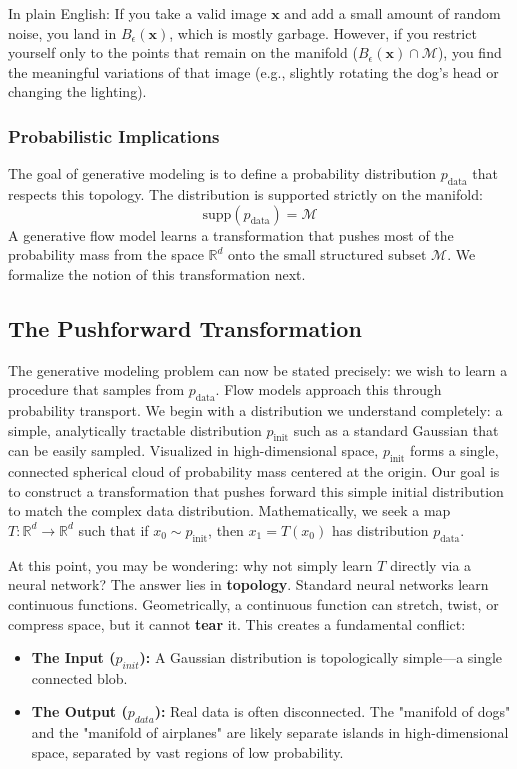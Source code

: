 \documentclass{book}
\begin{document}
In plain English: If you take a valid image $\mathbf{x}$ and add a small amount of random noise, you land in $B_\epsilon(\mathbf{x})$, which is mostly garbage. However, if you restrict yourself only to the points that remain on the manifold ($B_\epsilon(\mathbf{x}) \cap \mathcal{M}$), you find the meaningful variations of that image (e.g., slightly rotating the dog's head or changing the lighting).

\subsubsection{Probabilistic Implications}
The goal of generative modeling is to define a probability distribution $p_{\text{data}}$ that respects this topology. The distribution is supported strictly on the manifold:
\[
\text{supp}(p_{\text{data}}) = \mathcal{M}
\]
A generative flow model learns a transformation that pushes most of the probability mass from the space $\mathbb{R}^d$ onto the small structured subset $\mathcal{M}$. We formalize the notion of this transformation next.

\subsection{The Pushforward Transformation}
The generative modeling problem can now be stated precisely: we wish to learn a procedure that samples from $p_{\text{data}}$. Flow models approach this through probability transport. We begin with a distribution we understand completely: a simple, analytically tractable distribution $p_{\text{init}}$ such as a standard Gaussian that can be easily sampled. Visualized in high-dimensional space, $p_{\text{init}}$ forms a single, connected spherical cloud of probability mass centered at the origin. Our goal is to construct a transformation that pushes forward this simple initial distribution to match the complex data distribution. Mathematically, we seek a map $T: \mathbb{R}^d \to \mathbb{R}^d$ such that if $x_0 \sim p_{\text{init}}$, then $x_1 = T(x_0)$ has distribution $p_{\text{data}}$.

At this point, you may be wondering: why not simply learn $T$ directly via a neural network? The answer lies in \textbf{topology}. Standard neural networks learn continuous functions. Geometrically, a continuous function can stretch, twist, or compress space, but it cannot \textbf{tear} it. This creates a fundamental conflict:
\begin{itemize}
    \item \textbf{The Input ($p_{init}$):} A Gaussian distribution is topologically simple—a single connected blob.
    \item \textbf{The Output ($p_{data}$):} Real data is often disconnected. The "manifold of dogs" and the "manifold of airplanes" are likely separate islands in high-dimensional space, separated by vast regions of low probability.
\end{itemize}
\end{document}
